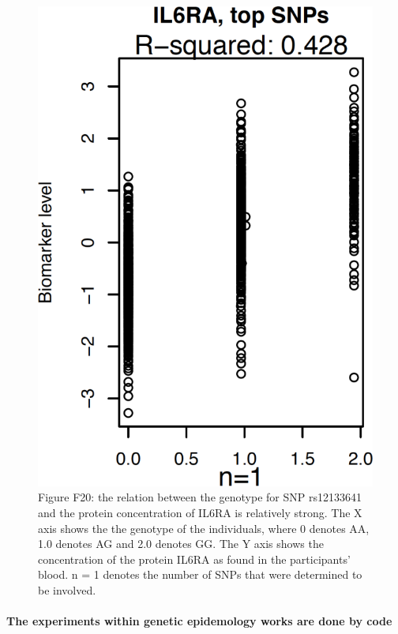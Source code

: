 \begin{figure}[!htbp]
  \centering
  \includegraphics[width=\linewidth]{ahsan2017relative_s6.png}
  \caption{
    Figure F20: the relation between the genotype for SNP rs12133641 
    and the protein concentration of IL6RA is relatively strong.
    The X axis shows the the genotype of the individuals,
    where 0 denotes AA, 1.0 denotes AG and 2.0 denotes GG.
    The Y axis shows the concentration of the protein IL6RA 
    as found in the participants' blood. n = 1 denotes the number
    of SNPs that were determined to be involved.
  }
  \label{fig:ahsan2017relative_s6}
\end{figure}

\paragraph{The experiments within genetic epidemology works are done by code}

